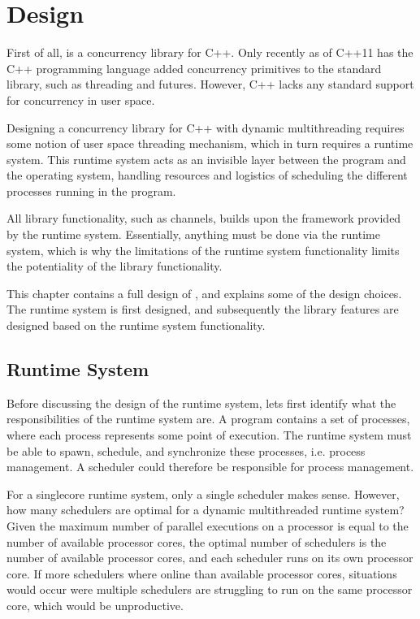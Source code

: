 

\chapter{Design}
\label{ch:design}


First of all, \Proxc{} is a concurrency library for C++. Only recently as of C++11 has the C++ programming language added concurrency primitives to the standard library, such as threading and futures. However, C++ lacks any standard support for concurrency in user space. 

Designing a concurrency library for C++ with dynamic multithreading requires some notion of user space threading mechanism, which in turn requires a runtime system. This runtime system acts as an invisible layer between the program and the operating system, handling resources and logistics of scheduling the different processes running in the program. 

All library functionality, such as channels, builds upon the framework provided by the runtime system. Essentially, anything must be done via the runtime system, which is why the limitations of the runtime system functionality limits the potentiality of the library functionality.

This chapter contains a full design of \Proxc{}, and explains some of the design choices. The runtime system is first designed, and subsequently the library features are designed based on the runtime system functionality. 


\section{Runtime System}


Before discussing the design of the runtime system, lets first identify what the responsibilities of the runtime system are. A \Proxc{} program contains a set of processes, where each process represents some point of execution. The runtime system must be able to spawn, schedule, and synchronize these processes, i.e. process management. A scheduler could therefore be responsible for process management. 

For a singlecore runtime system, only a single scheduler makes sense. However, how many schedulers are optimal for a dynamic multithreaded runtime system? Given the maximum number of parallel executions on a processor is equal to the number of available processor cores, the optimal number of schedulers is the number of available processor cores, and each scheduler runs on its own processor core. If more schedulers where online than available processor cores, situations would occur were multiple schedulers are struggling to run on the same processor core, which would be unproductive.

